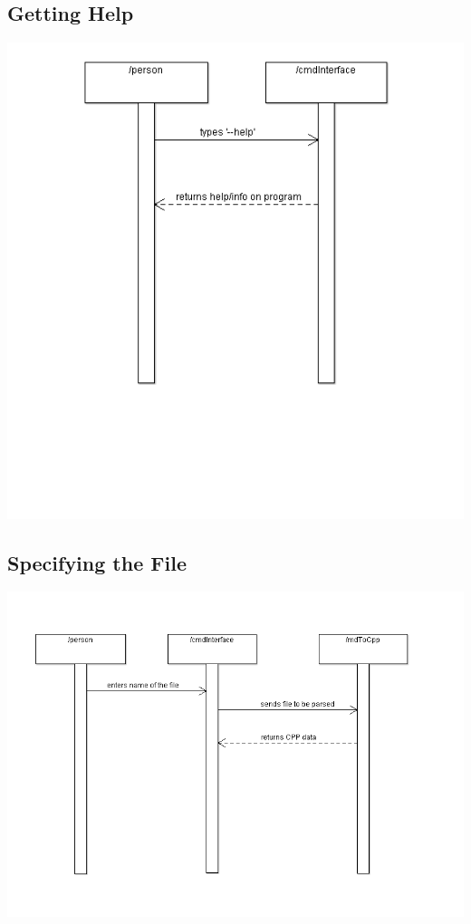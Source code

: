 \subsection{Getting Help}
\hspace{-2cm}\includegraphics[width=450pt]{images/GettingHelp.png}

\subsection{Specifying the File}
\hspace{-2cm}\includegraphics[width=500pt]{images/SpecifyingFile.png}

